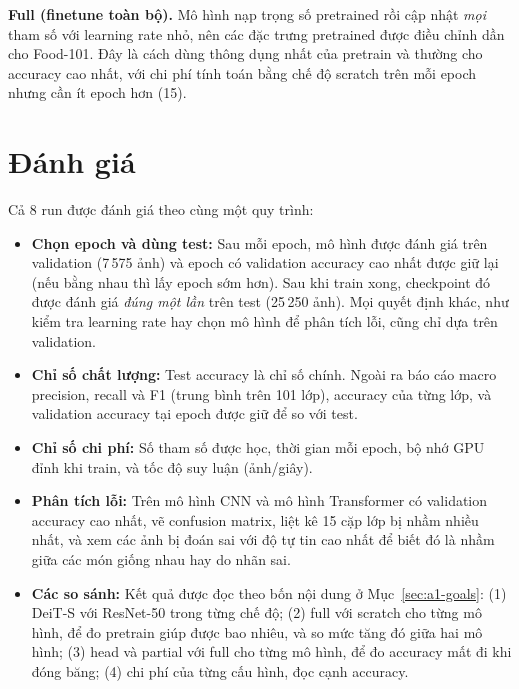 \documentclass[11pt,a4paper]{article}
\begin{document}
\textbf{Full (finetune toàn bộ).} Mô hình nạp trọng số pretrained rồi cập nhật \emph{mọi} tham số với learning rate nhỏ, nên các đặc trưng pretrained được điều chỉnh dần cho Food-101. Đây là cách dùng thông dụng nhất của pretrain và thường cho accuracy cao nhất, với chi phí tính toán bằng chế độ scratch trên mỗi epoch nhưng cần ít epoch hơn (15).

\section{Đánh giá}\label{sec:a1-eval}
Cả 8 run được đánh giá theo cùng một quy trình:
\begin{itemize}
\item \textbf{Chọn epoch và dùng test:} Sau mỗi epoch, mô hình được đánh giá trên validation (7\,575 ảnh) và epoch có validation accuracy cao nhất được giữ lại (nếu bằng nhau thì lấy epoch sớm hơn). Sau khi train xong, checkpoint đó được đánh giá \emph{đúng một lần} trên test (25\,250 ảnh). Mọi quyết định khác, như kiểm tra learning rate hay chọn mô hình để phân tích lỗi, cũng chỉ dựa trên validation.
\item \textbf{Chỉ số chất lượng:} Test accuracy là chỉ số chính. Ngoài ra báo cáo macro precision, recall và F1 (trung bình trên 101 lớp), accuracy của từng lớp, và validation accuracy tại epoch được giữ để so với test.
\item \textbf{Chỉ số chi phí:} Số tham số được học, thời gian mỗi epoch, bộ nhớ GPU đỉnh khi train, và tốc độ suy luận (ảnh/giây).
\item \textbf{Phân tích lỗi:} Trên mô hình CNN và mô hình Transformer có validation accuracy cao nhất, vẽ confusion matrix, liệt kê 15 cặp lớp bị nhầm nhiều nhất, và xem các ảnh bị đoán sai với độ tự tin cao nhất để biết đó là nhầm giữa các món giống nhau hay do nhãn sai.
\item \textbf{Các so sánh:} Kết quả được đọc theo bốn nội dung ở Mục~\ref{sec:a1-goals}: (1) DeiT-S với ResNet-50 trong từng chế độ; (2) full với scratch cho từng mô hình, để đo pretrain giúp được bao nhiêu, và so mức tăng đó giữa hai mô hình; (3) head và partial với full cho từng mô hình, để đo accuracy mất đi khi đóng băng; (4) chi phí của từng cấu hình, đọc cạnh accuracy.
\end{itemize}
\end{document}

